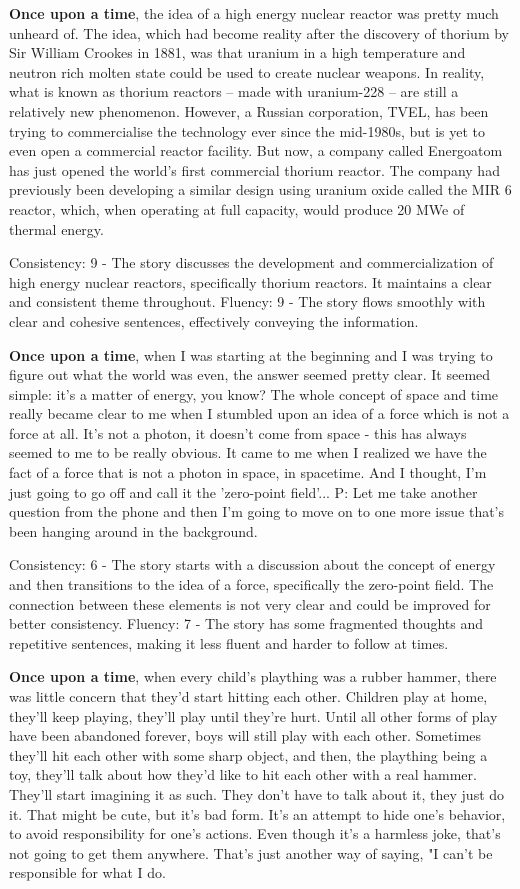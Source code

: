 \documentclass{article}
\begin{document}
\textbf{Once upon a time}, the idea of a high energy nuclear reactor was pretty much unheard of. The idea, which had become reality after the discovery of thorium by Sir William Crookes in 1881, was that uranium in a high temperature and neutron rich molten state could be used to create nuclear weapons. In reality, what is known as thorium reactors – made with uranium-228 – are still a relatively new phenomenon. However, a Russian corporation, TVEL, has been trying to commercialise the technology ever since the mid-1980s, but is yet to even open a commercial reactor facility. But now, a company called Energoatom has just opened the world's first commercial thorium reactor. The company had previously been developing a similar design using uranium oxide called the MIR 6 reactor, which, when operating at full capacity, would produce 20 MWe of thermal energy.

Consistency: 9 - The story discusses the development and commercialization of high energy nuclear reactors, specifically thorium reactors. It maintains a clear and consistent theme throughout.
Fluency: 9 - The story flows smoothly with clear and cohesive sentences, effectively conveying the information.

\textbf{Once upon a time}, when I was starting at the beginning and I was trying to figure out what the world was even, the answer seemed pretty clear. It seemed simple: it's a matter of energy, you know? The whole concept of space and time really became clear to me when I stumbled upon an idea of a force which is not a force at all. It's not a photon, it doesn't come from space - this has always seemed to me to be really obvious. It came to me when I realized we have the fact of a force that is not a photon in space, in spacetime. And I thought, I'm just going to go off and call it the 'zero-point field'...  P: Let me take another question from the phone and then I'm going to move on to one more issue that's been hanging around in the background.

Consistency: 6 - The story starts with a discussion about the concept of energy and then transitions to the idea of a force, specifically the zero-point field. The connection between these elements is not very clear and could be improved for better consistency.
Fluency: 7 - The story has some fragmented thoughts and repetitive sentences, making it less fluent and harder to follow at times.

\textbf{Once upon a time}, when every child's plaything was a rubber hammer, there was little concern that they'd start hitting each other. Children play at home, they'll keep playing, they'll play until they're hurt. Until all other forms of play have been abandoned forever, boys will still play with each other. Sometimes they'll hit each other with some sharp object, and then, the plaything being a toy, they'll talk about how they'd like to hit each other with a real hammer. They'll start imagining it as such. They don't have to talk about it, they just do it. That might be cute, but it's bad form. It's an attempt to hide one's behavior, to avoid responsibility for one's actions. Even though it's a harmless joke, that's not going to get them anywhere. That's just another way of saying, "I can't be responsible for what I do.
\end{document}
